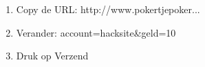 \begin{enumerate}
  \item Copy de URL: http://www.pokertjepoker...
  \item Verander: account=hacksite\&geld=10
  \item Druk op Verzend
\end{enumerate}